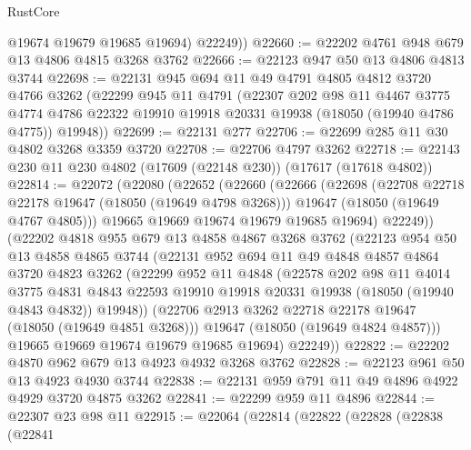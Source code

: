 \begin{lexlean}{RustCore}
\begin{coremodule}
          @19674
          @19679
          @19685
          @19694)
        @22249))
@22660 := @22202 @4761 @948 @679 @13 @4806 @4815 @3268 @3762
@22666 := @22123 @947 @50 @13 @4806 @4813 @3744
@22698 := @22131
    @945
    @694
    @11
    @49
    @4791
    @4805
    @4812
    @3720
    @4766
    @3262
    (@22299
      @945
      @11
      @4791
      (@22307
        @202
        @98
        @11
        @4467
        @3775
        @4774
        @4786
        @22322
        @19910
        @19918
        @20331
        @19938
        (@18050 (@19940 @4786 @4775))
        @19948))
@22699 := @22131 @277
@22706 := @22699 @285 @11 @30 @4802 @3268 @3359 @3720
@22708 := @22706 @4797 @3262
@22718 := @22143 @230 @11 @230 @4802 (@17609 (@22148 @230)) (@17617 (@17618 @4802))
@22814 := @22072
    (@22080
      (@22652
        (@22660
          (@22666
            (@22698
              (@22708 @22718 @22178 @19647 (@18050 (@19649 @4798 @3268)))
              @19647
              (@18050 (@19649 @4767 @4805)))
            @19665
            @19669
            @19674
            @19679
            @19685
            @19694)
          @22249))
      (@22202
        @4818
        @955
        @679
        @13
        @4858
        @4867
        @3268
        @3762
        (@22123
          @954
          @50
          @13
          @4858
          @4865
          @3744
          (@22131
            @952
            @694
            @11
            @49
            @4848
            @4857
            @4864
            @3720
            @4823
            @3262
            (@22299
              @952
              @11
              @4848
              (@22578
                @202
                @98
                @11
                @4014
                @3775
                @4831
                @4843
                @22593
                @19910
                @19918
                @20331
                @19938
                (@18050 (@19940 @4843 @4832))
                @19948))
            (@22706 @2913 @3262 @22718 @22178 @19647 (@18050 (@19649 @4851 @3268)))
            @19647
            (@18050 (@19649 @4824 @4857)))
          @19665
          @19669
          @19674
          @19679
          @19685
          @19694)
        @22249))
@22822 := @22202 @4870 @962 @679 @13 @4923 @4932 @3268 @3762
@22828 := @22123 @961 @50 @13 @4923 @4930 @3744
@22838 := @22131 @959 @791 @11 @49 @4896 @4922 @4929 @3720 @4875 @3262
@22841 := @22299 @959 @11 @4896
@22844 := @22307 @23 @98 @11
@22915 := @22064
    (@22814
      (@22822
        (@22828
          (@22838
            (@22841

\end{coremodule}
\end{lexlean}
